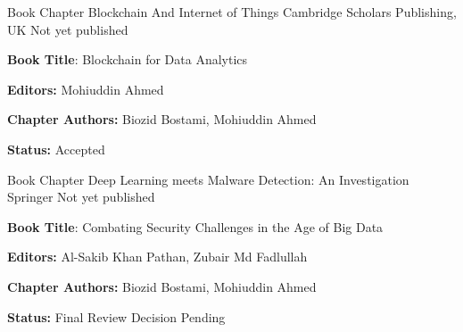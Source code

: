 \begin{cventries}
	\cventry
	{Book Chapter} %
	{Blockchain And Internet of Things} %
	{ Cambridge Scholars Publishing, UK} %
	{Not yet published} %
	{	\begin{cvitems} %
			\item {\textbf{Book Title}: Blockchain for Data Analytics }
			\item {\textbf{Editors:} Mohiuddin Ahmed }
			\item {\textbf{Chapter Authors:} Biozid Bostami, Mohiuddin Ahmed }
			\item {\textbf{Status:} Accepted }
		\end{cvitems}
	}
	\cventry
	{Book Chapter} %
	{Deep Learning meets Malware Detection: An Investigation} %
	{ Springer} %
	{Not yet published} %
	{	\begin{cvitems} %
			\item {\textbf{Book Title}: Combating Security Challenges in the Age of Big Data }
			\item {\textbf{Editors:} Al-Sakib Khan Pathan, Zubair Md Fadlullah }
			\item {\textbf{Chapter Authors:} Biozid Bostami, Mohiuddin Ahmed }
			\item {\textbf{Status:} Final Review Decision Pending }
		\end{cvitems}
	}
	
	
\end{cventries}
